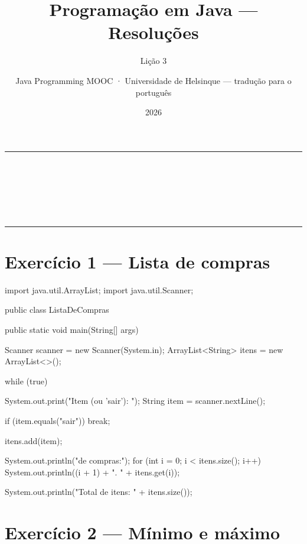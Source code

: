 \documentclass[11pt,a4paper]{article}
\title{Programação em Java — Resoluções}
\subtitle{Lição 3}
\author{Java Programming MOOC · Universidade de Helsinque — tradução para o português}
\date{2026}
\makeatletter
\renewcommand{\maketitle}{%
  \begin{center}
    {\color{javaRule}\rule{\linewidth}{1pt}}\\[6pt]
    {\Huge\sffamily\bfseries\color{javaOrange} \@title}\\[6pt]
    \ifx\@subtitle\undefined\else
      {\Large\sffamily\color{javaDeep} \@subtitle}\\[4pt]
    \fi
    {\small\sffamily\color{gray} \@author}\\[2pt]
    {\small\sffamily\color{gray} \@date}\\[6pt]
    {\color{javaRule}\rule{\linewidth}{1pt}}
  \end{center}
  \vspace{1em}
}
\makeatother
\begin{document}
\maketitle
\tableofcontents
\vspace{1.5em}

\section{Exercício 1 --- Lista de compras}

\begin{javacode}
import java.util.ArrayList;
import java.util.Scanner;

public class ListaDeCompras {
    public static void main(String[] args) {
        Scanner scanner = new Scanner(System.in);
        ArrayList<String> itens = new ArrayList<>();

        while (true) {
            System.out.print("Item (ou 'sair'): ");
            String item = scanner.nextLine();

            if (item.equals("sair")) {
                break;
            }

            itens.add(item);
        }

        System.out.println("\nLista de compras:");
        for (int i = 0; i < itens.size(); i++) {
            System.out.println((i + 1) + ". " + itens.get(i));
        }

        System.out.println("Total de itens: " + itens.size());
    }
}
\end{javacode}

\section{Exercício 2 --- Mínimo e máximo}
\end{document}
